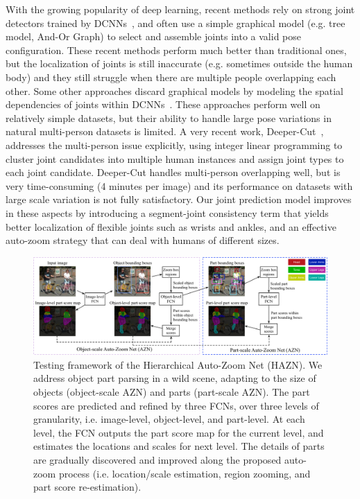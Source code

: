 With the growing popularity of deep learning, recent methods rely on strong joint detectors trained by DCNNs~\cite{chen2014articulated,tompson2015efficient}, and often use a simple graphical model (e.g. tree model, And-Or Graph) to select and assemble joints into a valid pose configuration.
These recent methods perform much better than traditional ones, but the localization of joints is still inaccurate (e.g. sometimes outside the human body) and they still struggle when there are multiple people overlapping each other.
Some other approaches discard graphical models by modeling the spatial dependencies of joints within DCNNs~\cite{toshev2014deeppose,carreira2016human,chu2016structured}. These approaches perform well on relatively simple datasets, but their ability to handle large pose variations in natural multi-person datasets is limited.
A very recent work, Deeper-Cut~\cite{insafutdinov2016deepercut}, addresses the multi-person issue explicitly, using integer linear programming to cluster joint candidates into multiple human instances and assign joint types to each joint candidate.
Deeper-Cut handles multi-person overlapping well, but is very time-consuming (4 minutes per image) and its performance on datasets with large scale variation is not fully satisfactory. Our joint prediction model improves in these aspects by introducing a segment-joint consistency term that yields better localization of flexible joints such as wrists and ankles, and an effective auto-zoom strategy that can deal with humans of different sizes.

\begin{figure}
\begin{center}
 \includegraphics[width=1.0\textwidth]{figs/framework_eccv.pdf}
\end{center}
\caption{Testing framework of the Hierarchical Auto-Zoom Net (HAZN). We address object part parsing in a wild scene, adapting to the size of objects (object-scale AZN) and parts (part-scale AZN). The part scores are predicted and refined by three FCNs, over three levels of granularity, i.e. image-level, object-level, and part-level. At each level, the FCN outputs the part score map for the current level, and estimates the locations and scales for next level. The details of parts are gradually discovered and improved along the proposed auto-zoom process (i.e. location/scale estimation, region zooming, and part score re-estimation).}
\label{fig:framework_eccv}
\end{figure}

